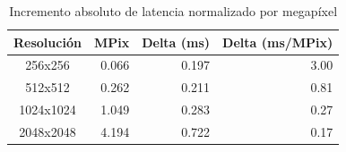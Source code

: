 \begin{table}[htbp]
\centering
\renewcommand{\arraystretch}{1.2}
\setlength{\tabcolsep}{8pt}
\begin{tabular}{|c|r|r|r|}
\hline
\rowcolor[gray]{0.90}
\textbf{Resolución} & \textbf{MPix} & \textbf{Delta (ms)} & \textbf{Delta (ms/MPix)} \\
\hline
256x256 & 0.066 & 0.197 & 3.00 \\
\hline
512x512 & 0.262 & 0.211 & 0.81 \\
\hline
1024x1024 & 1.049 & 0.283 & 0.27 \\
\hline
2048x2048 & 4.194 & 0.722 & 0.17 \\
\hline
\end{tabular}
\caption{Incremento absoluto de latencia normalizado por megapíxel}
\label{tab:complexity_delta_mpix_equipo1_float32}
\end{table}
